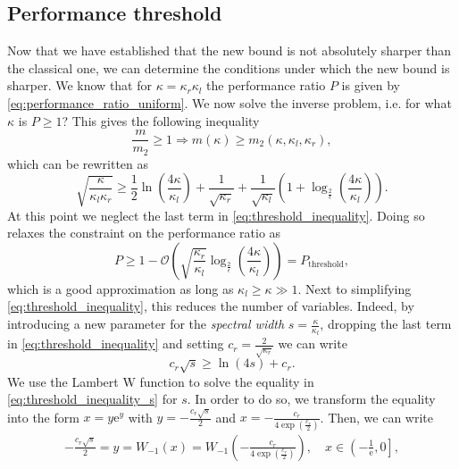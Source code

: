 \subsection{Performance threshold}\label{sec:performance_threshold}
Now that we have established that the new bound is not absolutely sharper than the classical one, we can determine the conditions under which the new bound is sharper. We know that for $\kappa=\kappa_r\kappa_l$ the performance ratio $P$ is given by \cref{eq:performance_ratio_uniform}. We now solve the inverse problem, i.e. for what $\kappa$ is $P \geq 1$? This gives the following inequality
\[
    \frac{m}{m_2} \geq 1 \Rightarrow m(\kappa) \geq m_2(\kappa, \kappa_l, \kappa_r),
\]
which can be rewritten as
\begin{equation}
    \sqrt{\frac{\kappa}{\kappa_l\kappa_r}} \geq \frac{1}{2}\ln\left(\frac{4\kappa}{\kappa_l}\right) + \frac{1}{\sqrt{\kappa_r}} + \frac{1}{\sqrt{\kappa_l}}\left(1 + \log_{\frac{2}{\epsilon}}\left(\frac{4\kappa}{\kappa_l}\right)\right).
    \label{eq:threshold_inequality}
\end{equation}
At this point we neglect the last term in \cref{eq:threshold_inequality}. Doing so relaxes the constraint on the performance ratio as
\begin{equation}
    P \geq 1 - \mathcal{O}\left(\sqrt{\frac{\kappa_r}{\kappa_l}}\log_{\frac{2}{\epsilon}}\left(\frac{4\kappa}{\kappa_l}\right)\right) = P_{\text{threshold}},
    \label{eq:approximate_performance_ratio_threshold}
\end{equation}
which is a good approximation as long as $\kappa_l \geq \kappa \gg 1$. Next to simplifying \cref{eq:threshold_inequality}, this reduces the number of variables. Indeed, by introducing a new parameter for the \textit{spectral width} $s = \frac{\kappa}{\kappa_l}$, dropping the last term in \cref{eq:threshold_inequality} and setting $c_r = \frac{2}{\sqrt{\kappa_r}}$ we can write
\begin{equation}
    c_r\sqrt{s} \geq \ln\left(4s\right) + c_r.
    \label{eq:threshold_inequality_s}
\end{equation}
We use the Lambert $\mathrm{W}$ function to solve the equality in \cref{eq:threshold_inequality_s} for $s$. In order to do so, we transform the equality into the form $x = y \mathrm{e}^y$ with $y = -\frac{c_r\sqrt{s}}{2}$ and $x = -\frac{c_r}{4\exp\left(\frac{c_r}{2}\right)}$. Then, we can write
\begin{align*}
    -\frac{c_r\sqrt{s}}{2} = y = W_{-1}(x) = W_{-1}\left(-\frac{c_r}{4\exp\left(\frac{c_r}{2}\right)}\right), \quad x \in \left(-\frac{1}{\mathrm{e}}, 0 \right],
\end{align*}
